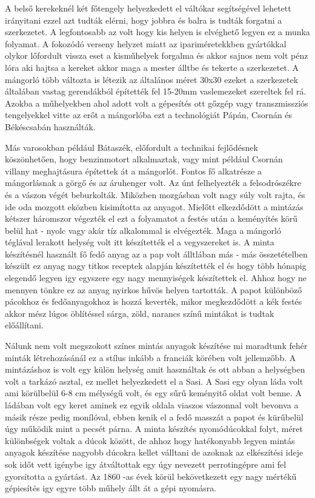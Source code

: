 \documentclass[fontsize=12pt, appendixprefix=true]{scrreprt}
\begin{document}

A belső kerekeknél két főtengely helyezkedett el váltókar segítségével lehetett irányitani ezzel azt tudták elérni, hogy jobbra és balra is tudták forgatni a szerkezetet. A legfontosabb az volt hogy kis helyen is elvéghető legyen ez a munka folyamat. A fokozódó verseny helyzet miatt az ipariméretekkben gyártókkal olykor lőfordult vissza eset a kisműhelyek forgalma és akkor sajnos nem volt pénz lóra aki hajtsa a kereket akkor maga a mester álltbe és tekerte a szerkezetet. A mángorló több változta is létezik az általános méret 30x30  ezeket a szerkezetek általában vastag gerendákból építették fel 15-20mm vaslemezeket szereltek fel rá.
Azokba a műhelyekben ahol adott volt a gépesítés ott gőzgép vagy transzmissziós tengelyekkel vitte az erőt a mángorlóba ezt a technológiát Pápán, Csornán és  Békéscsabán használták.

Más varosokban például Bátaszék, előfordult a technikai fejlődésnek köszönhetően, hogy benzinmotort alkalmaztak, vagy mint például Csornán villany meghajtásura építettek át a mángorlót. Fontos fő alkatrésze a mángorlásnak a görgő és az áruhenger volt. Az únt felhelyezték a felsodrószékre és a vászon végét beburkolták. Miközben mozgásban volt nagy súly volt rajta, és ide oda mozgott eközben kisimította az anyagot. Mielőtt elkezdődött a mintázás kétszer háromszor végezték el ezt a folyamatot a festés után a keményítés körű belül hat - nyolc  vagy akár tíz alkalommal is elvégezték. Maga a mángorló téglával lerakott helység volt itt készítették el a vegyszereket is. 
A minta készítésnél használt fő fedő anyag az a pap volt álltlában más - más összetételben készült ez anyag nagy titkos receptek alapján készítették el és hogy több hónapig elegendő legyen igy egyszere egy nagy mennyiségek készítettek el.  Ahhoz hogy ne mennyen tönkre ez az anyag nyirkos hűvös helyen tartották. A papot különböző  pácokhoz és fedőanyagokhoz is hozzá keverték, mikor megkezdődött a kék festés akkor mész lúgos öblítéssel sárga, zöld, narancs színű mintákat is tudtak előállítani.

Nálunk nem volt megszokott színes mintás anyagok készítése mi maradtunk fehér minták létrehozásánál ez a stílus inkább a franciák körében volt jellemzőbb. A mintázáshoz is volt egy külön helység amit használtak és ott abban a helységben volt a tarkázó asztal, ez mellet helyezkedett el a Sasi.
A Sasi egy olyan láda volt ami körülbelül 6-8 cm mélységű volt, és egy sűrű keményitő oldat volt benne. A ládában volt egy keret aminek ez egyik oldala viaszos vászonnal volt bevonva a másik része pedig monílóval, ebben kenik el a fedő masszát a papot és kürűbelül úgy működik mint a pecsét párna.
A minta készítés nyomódúcokkal folyt, méret különbségek voltak a dúcok között, de ahhoz hogy hatékonyabb legyen mintás anyagok készítése nagyobb dúcokra kellet válltani de azoknak az elkészítési ideje sok időt vett igénybe igy átváltottak egy úgy nevezett perrotingépre ami fel gyorsította a gyártást. Az 1860 -as évek körül bekövetkezett egy nagy mértékű gépiesítés igy egyre több műhely állt át a gépi nyomásra.
\end{document}
